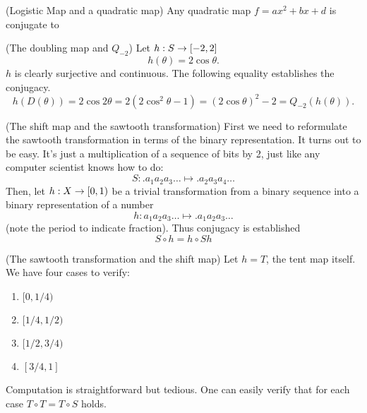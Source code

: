 \documentclass[12pt]{book}
\begin{document}
\begin{proposition}
  (Logistic Map and a quadratic map)
  Any quadratic map $f = ax^2 + bx + d$ is conjugate to 
\end{proposition}

\begin{proposition}
  (The doubling map and $Q_{-2}$)
  Let $h: S \rightarrow [-2,2]$
  \begin{equation*}
    h(\theta) = 2\cos\theta.
  \end{equation*}
  $h$ is clearly surjective and continuous.
  The following equality establishes the conjugacy.
  \begin{equation*}
    h(D(\theta)) = 2\cos2\theta = 2(2\cos^2\theta - 1) = (2\cos\theta)^2 - 2 = Q_{-2}(h(\theta)).
  \end{equation*}
\end{proposition}

\begin{proposition}
  (The shift map and the sawtooth transformation)
  First we need to reformulate the sawtooth transformation in terms of the binary representation.
  It turns out to be easy. It's just a multiplication of a sequence of bits by 2, just like any computer scientist knows how to do:
  \begin{equation*}
    S: .a_1a_2a_3\ldots \mapsto .a_2a_3a_4\ldots
  \end{equation*}
  Then, let $h: X \rightarrow [0,1)$ be a trivial transformation from a binary sequence into a binary representation of a number
    \begin{equation*}
      h: a_1a_2a_3\ldots \mapsto .a_1a_2a_3\ldots
    \end{equation*}
    (note the period to indicate fraction).
  Thus conjugacy is established
  \begin{equation*}
    S \circ h = h \circ Sh
  \end{equation*}
  \end{proposition}

  \begin{proposition}
    (The sawtooth transformation and the shift map)
    Let $h = T$, the tent map itself. We have four cases to verify:
    \begin{enumerate}[$(i)$]
      \item $[0,1/4)$
      \item $[1/4, 1/2)$
      \item $[1/2, 3/4)$
      \item $[3/4, 1]$
    \end{enumerate}
    Computation is straightforward but tedious. One can easily verify that
    for each case $T\circ T = T\circ S$ holds.
  \end{proposition}



\end{document}
